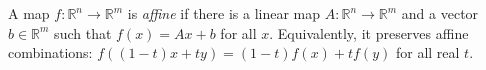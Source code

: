 
A map $f:\mathbb R^n\to\mathbb R^m$ is \emph{affine} if there is a linear map $A:\mathbb R^n\to\mathbb R^m$ and a vector $b\in\mathbb R^m$ such that $f(x)=Ax+b$ for all $x$. Equivalently, it preserves affine combinations: $f((1-t)x+ty)=(1-t)f(x)+tf(y)$ for all real $t$.
